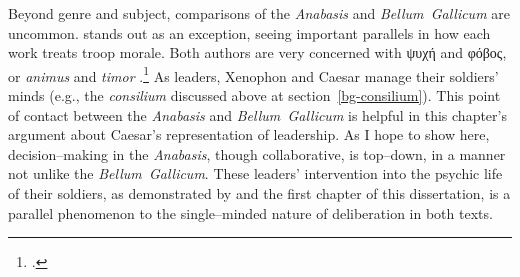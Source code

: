 \documentclass[12pt,letterpaper,oneside,final]{memoir}
\begin{document}
Beyond genre and subject, comparisons of the \emph{Anabasis} and \emph{Bellum~Gallicum} are uncommon. \textcite{lendon1999} stands out as an exception, seeing important parallels in how each work treats troop morale. Both authors are very concerned with \textgreek{ψυχή} and \textgreek{φόβος}, or \emph{animus} and \emph{timor} \parencite[295--296]{lendon1999}.\footnote{.} As leaders, Xenophon and Caesar manage their soldiers' minds (e.g., the \emph{consilium} discussed above at section~\ref{bg-consilium}). This point of contact between the \emph{Anabasis} and \emph{Bellum~Gallicum} is helpful in this chapter's argument about Caesar's representation of leadership. As I hope to show here, decision--making in the \emph{Anabasis}, though collaborative, is top--down, in a manner not unlike the \emph{Bellum~Gallicum}. These leaders' intervention into the psychic life of their soldiers, as demonstrated by \textcite{lendon1999} and the first chapter of this dissertation, is a parallel phenomenon to the single--minded nature of deliberation in both texts.
\end{document}

